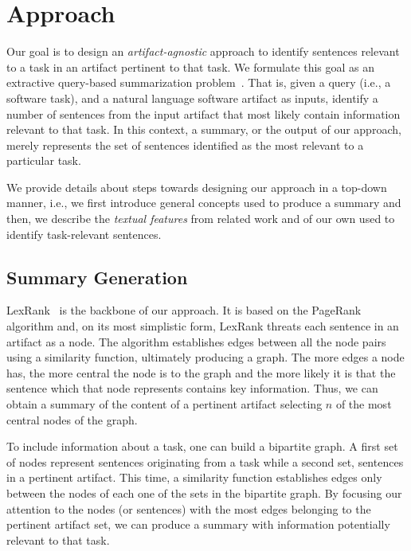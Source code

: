 \section{Approach}
\label{cp5:approaches}


Our goal is to design an \textit{artifact-agnostic} approach
to identify sentences relevant to a task in an artifact pertinent to that task.
We formulate this goal as an extractive query-based summarization problem~\cite{Goldsteinet1999}.
That is, given a query (i.e., a software task),
and a natural language software artifact as inputs,
identify a number of sentences from the input artifact that
most likely contain information relevant to that task. 
In this context, a summary, or the output of our approach, 
merely represents the set of sentences identified as 
the most relevant to a particular task.



We provide details about steps towards designing our approach in a top-down manner, i.e., we first introduce general concepts
used to produce a summary and then, we describe
the \textit{textual features} from related work and of our own used to identify task-relevant sentences.




\subsection{Summary Generation}


LexRank~\cite{Erkan2004} is the backbone of our approach. 
It is based on the PageRank~\cite{Page1999} algorithm
and, on its most simplistic form, LexRank threats each sentence in an artifact as a node.
The algorithm
establishes edges between all the node pairs using a similarity function, ultimately producing a graph. 
The more edges a node has, the more central the node is to the graph and the more likely it is that the sentence which that node represents contains key information. 
Thus, we can obtain a summary of the content of a pertinent artifact selecting $n$ of the most central nodes of the graph. 


To include information about a task, one can build a bipartite graph.
A first set of nodes represent sentences originating from a task while a second set, sentences in a pertinent artifact.
This time,  a similarity function 
establishes edges only between the nodes of each one of the sets in the bipartite graph.
By focusing our attention to the nodes (or sentences) with the most edges belonging to the pertinent artifact set, we can produce a summary with information potentially relevant to that task.



